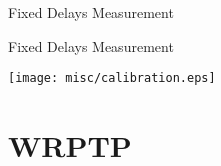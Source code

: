 \documentclass[compress,red]{beamer}
\begin{document}
\logo{}
\begin{frame}{Fixed Delays Measurement}


\end{frame}
\begin{frame}{Fixed Delays Measurement}

  \begin{center}
  \texttt{[image: misc/calibration.eps]}
  \end{center}

\end{frame}
\section{WRPTP}
\end{document}
